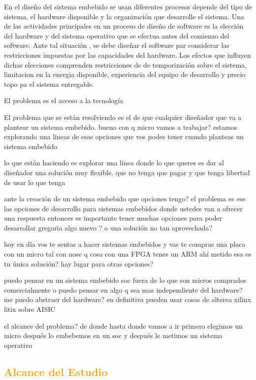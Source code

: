 \documentclass[a4paper,11pt]{article}
\begin{document}
En el diseño del sistema embebido se usan diferentes procesos depende del tipo de sistema, el hardware disponible y la organización que desarrolle el sistema. Una de las actividades principales en un proceso de diseño de software es la elección del hardware y del sistema operativo que se efectua antes del comienzo del software. Ante tal situación , se debe diseñar el software par considerar las restricciones impuestas por las capacidades del hardware.
Los efectos que influyen dichas elecciones comprenden restricciones de de temporización sobre el sistema, limitacion en la energia disponible, experiencia del equipo de desarrollo y precio topo pa el sistema entregable.


El problema es el acceso a la tecnología

El problema que se están resolviendo es el de que cualquier diseñador que va a plantear un sistema embebido. 
bueno con q micro vamos a trabajar?
estamos explorando una líneas de esas opciones que vos podes tener cuando planteas un sistema embebido 

lo que están haciendo es explorar una línea donde lo que queres es dar al diseñador una solución muy flexible. que no tenga que pagar y que tenga libertad de usar lo que tenga

ante la creación de un sistema embebido que opciones tengo?
el problema es ese las opciones de desarrollo para sistemas embebidos donde ustedes van a ofrecer una respuesta entonces es importante tener muchas opciones para poder desarrollar 
gregaria algo nuevo ? o una solución no tan aprovechada?

hoy en día vos te sentas a hacer sistemas embebidos y vas te compras una placa con un micro tal con nose q cosa con una FPGA tenes un ARM ahí metido 
esa es tu única solución?
hay lugar para otras opciones?

puedo pensar en un sistema embebido soc fuera de lo que son micros comprados comercialmente o puedo pensar en algo q sea mas independiente del hardware?
me puedo abstraer del hardware?
en definitiva pueden usar cosas de alterea xilinx litix sobre AISIC

el alcance del problema?
de donde hasta donde vamos a ir
primero elegimos un micro después lo embebemos en un soc y después le metimos un sistema operativo

\subsection{\textcolor{orange}{Alcance del Estudio}}
\end{document}

